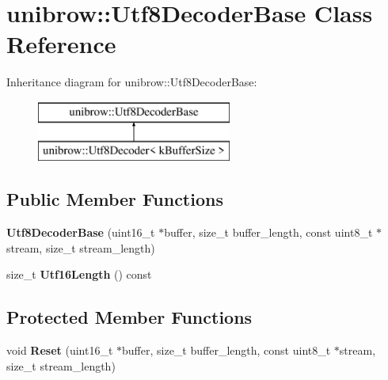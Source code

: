 \hypertarget{classunibrow_1_1_utf8_decoder_base}{}\section{unibrow\+:\+:Utf8\+Decoder\+Base Class Reference}
\label{classunibrow_1_1_utf8_decoder_base}
Inheritance diagram for unibrow\+:\+:Utf8\+Decoder\+Base\+:\begin{figure}[H]
\begin{center}
\leavevmode
\includegraphics[height=2.000000cm]{classunibrow_1_1_utf8_decoder_base}
\end{center}
\end{figure}
\subsection*{Public Member Functions}
\begin{DoxyCompactItemize}
\item 
{\bfseries Utf8\+Decoder\+Base} (uint16\+\_\+t $\ast$buffer, size\+\_\+t buffer\+\_\+length, const uint8\+\_\+t $\ast$stream, size\+\_\+t stream\+\_\+length)\hypertarget{classunibrow_1_1_utf8_decoder_base_a7d60e2dfcc997b0101adaa0cd895878b}{}\label{classunibrow_1_1_utf8_decoder_base_a7d60e2dfcc997b0101adaa0cd895878b}

\item 
size\+\_\+t {\bfseries Utf16\+Length} () const \hypertarget{classunibrow_1_1_utf8_decoder_base_a21325bdacea3a6f347f86a2ff1d227c0}{}\label{classunibrow_1_1_utf8_decoder_base_a21325bdacea3a6f347f86a2ff1d227c0}

\end{DoxyCompactItemize}
\subsection*{Protected Member Functions}
\begin{DoxyCompactItemize}
\item 
void {\bfseries Reset} (uint16\+\_\+t $\ast$buffer, size\+\_\+t buffer\+\_\+length, const uint8\+\_\+t $\ast$stream, size\+\_\+t stream\+\_\+length)\hypertarget{classunibrow_1_1_utf8_decoder_base_a3372b0a7906f7a62915959de04efc3d5}{}\label{classunibrow_1_1_utf8_decoder_base_a3372b0a7906f7a62915959de04efc3d5}

\end{DoxyCompactItemize}
